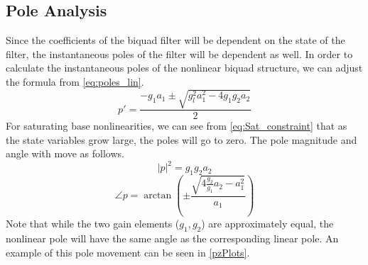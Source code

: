 \documentclass[twoside,a4paper]{article}
\begin{document}
\subsection{Pole Analysis}
%
Since the coefficients of the biquad filter will be dependent on the
state of the filter, the instantaneous poles of the filter will be
dependent as well. In order to calculate the instantaneous poles of
the nonlinear biquad structure, we can adjust the formula from
\cref{eq:poles_lin}.
%
\begin{equation}
    p' = \frac{-g_1 a_1 \pm \sqrt{g_l^2 a_1^2- 4 g_1 g_2 a_2}}{2}
    \label{eq:poles_nl}
\end{equation}
%
For saturating base nonlinearities, we can see from \cref{eq:Sat_constraint}
that as the state variables grow large, the poles will go to zero.
\newline\newline
The pole magnitude and angle with move as follows.
\begin{equation}
    |p|^2 = g_1g_2a_2
    \label{eq:poles_nl_mag}
\end{equation}
%
\begin{equation}
    \angle p = \arctan \left( \pm \frac{\sqrt{4\frac{g_2}{g_1}a_2 - a_1^2}}{a_1} \right)
    \label{eq:poles_nl_angle}
\end{equation}
%
Note that while the two gain elements ($g_1, g_2$) are approximately
equal, the nonlinear pole will have the same angle as the
corresponding linear pole. An example of this pole movement
can be seen in \cref{pzPlots}.
%
\end{document}
